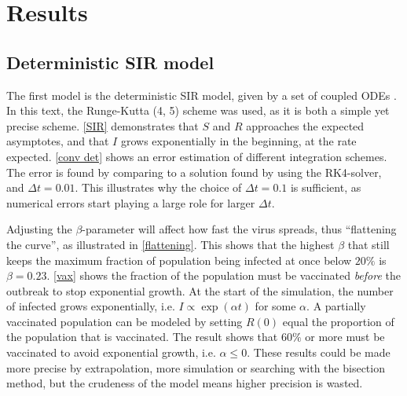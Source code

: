 \documentclass{article}
\begin{document}
    \section*{Results}
    \subsection*{Deterministic SIR model}
    The first model is the deterministic SIR model, given by a set of coupled ODEs \cite{exam}. 
    In this text, the Runge-Kutta (4, 5) scheme was used, as it is both a simple yet precise scheme.
    \autoref{SIR} demonstrates that $S$ and $R$ approaches the expected asymptotes, and that $I$ grows exponentially in the beginning, at the rate expected.
    \autoref{conv det} shows an error estimation of different integration schemes.
    The error is found by comparing to a solution found by using the RK4-solver, and $\Delta t = 0.01$.
    This illustrates why the choice of $\Delta t = 0.1$ is sufficient, as numerical errors start playing a large role for larger $\Delta t$.
    
    Adjusting the $\beta$-parameter will affect how fast the virus spreads, thus ``flattening the curve'', as illustrated in \autoref{flattening}.
    This shows that the highest $\beta$ that still keeps the maximum fraction of population being infected at once below $20\%$ is $\beta=0.23$. 
    \autoref{vax} shows the fraction of the population must be vaccinated \emph{before} the outbreak to stop exponential growth. 
    At the start of the simulation, the number of infected grows exponentially, i.e. $I \propto \exp(\alpha t)$ for some $\alpha$.
    A partially vaccinated population can be modeled by setting $R(0)$ equal the proportion of the population that is vaccinated.
    The result shows that $60\%$ or more must be vaccinated to avoid exponential growth, i.e. $\alpha\leq 0$. 
    These results could be made more precise by extrapolation, more simulation or searching with the bisection method, but the crudeness of the model means higher precision is wasted.
\end{document}
